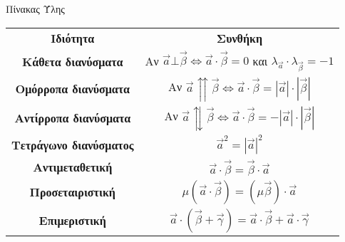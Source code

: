 \documentclass[internet]{frontisthrio}
\begin{document}
\begin{mybox}[mysubtitle]{Πίνακας Ύλης}
\begin{center}
\begin{longtable}{cc}
\hline \rule[-2ex]{0pt}{5.5ex} \textbf{Ιδιότητα} & \textbf{Συνθήκη} \\ 
\hhline{==}  \rule[-2ex]{0pt}{5.5ex} \textbf{Κάθετα διανύσματα} & Αν $ \vec{a}\bot\vec{\beta}\Leftrightarrow \vec{a}\cdot\vec{\beta}=0 $ και $ \lambda_{\vec{a}}\cdot\lambda_{\vec{\beta}}=-1 $ \\ 
 \rule[-2ex]{0pt}{5.5ex} \textbf{Ομόρροπα διανύσματα} & Αν $ \vec{a}\upuparrows\vec{\beta}\Leftrightarrow \vec{a}\cdot\vec{\beta}=|\vec{a}|\cdot|\vec{\beta}| $ \\ 
 \rule[-2ex]{0pt}{5.5ex} \textbf{Αντίρροπα διανύσματα} & Αν $ \vec{a}\updownarrows\vec{\beta}\Leftrightarrow \vec{a}\cdot\vec{\beta}=-|\vec{a}|\cdot|\vec{\beta}| $ \\ 
 \rule[-2ex]{0pt}{5.5ex} \textbf{Τετράγωνο διανύσματος} & $ \vec{a}^2=|\vec{a}|^2 $ \\ 
\rule[-2ex]{0pt}{5.5ex} \textbf{Αντιμεταθετική} & $ \vec{a}\cdot\vec{\beta}=\vec{\beta}\cdot\vec{a} $ \\
 \rule[-2ex]{0pt}{5.5ex} \textbf{Προσεταιριστική} & $ \mu(\vec{a}\cdot\vec{\beta})=(\mu\vec{\beta})\cdot\vec{a} $ \\
\rule[-2ex]{0pt}{5.5ex} \textbf{Επιμεριστική} & $ \vec{a}\cdot\left( \vec{\beta}+\vec{\gamma}\right) =\vec{a}\cdot\vec{\beta}+\vec{a}\cdot\vec{\gamma} $ \\
\hline 
\end{longtable} 
\end{center} 
\end{mybox}
\end{document}
